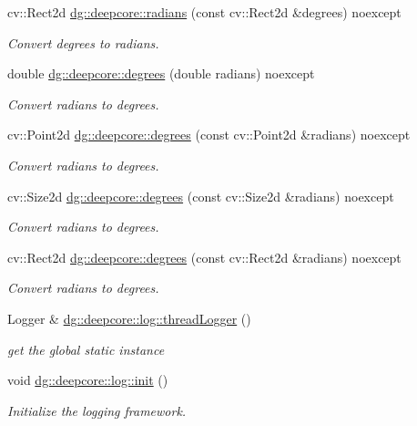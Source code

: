\begin{DoxyCompactItemize}
cv\+::\+Rect2d \hyperlink{group___utility_module_ga7712032c74d8bc4e9c392964d4e18e8c}{dg\+::deepcore\+::radians} (const cv\+::\+Rect2d \&degrees) noexcept
\begin{DoxyCompactList}\small\item\em Convert degrees to radians. \end{DoxyCompactList}\item 
double \hyperlink{group___utility_module_gac74d2fa0aeac8bd310ed61663a153e84}{dg\+::deepcore\+::degrees} (double radians) noexcept
\begin{DoxyCompactList}\small\item\em Convert radians to degrees. \end{DoxyCompactList}\item 
cv\+::\+Point2d \hyperlink{group___utility_module_ga8ee006518e8f0489aa3e18166d74c6fe}{dg\+::deepcore\+::degrees} (const cv\+::\+Point2d \&radians) noexcept
\begin{DoxyCompactList}\small\item\em Convert radians to degrees. \end{DoxyCompactList}\item 
cv\+::\+Size2d \hyperlink{group___utility_module_gaa1f8aec2237eca2394ae5df2528e8eca}{dg\+::deepcore\+::degrees} (const cv\+::\+Size2d \&radians) noexcept
\begin{DoxyCompactList}\small\item\em Convert radians to degrees. \end{DoxyCompactList}\item 
cv\+::\+Rect2d \hyperlink{group___utility_module_ga1be3f98796bf80ec2aa5899e73269be7}{dg\+::deepcore\+::degrees} (const cv\+::\+Rect2d \&radians) noexcept
\begin{DoxyCompactList}\small\item\em Convert radians to degrees. \end{DoxyCompactList}\item 
Logger \& \hyperlink{group___utility_module_ga94a3335f72a1830e58c8386c35015b2b}{dg\+::deepcore\+::log\+::thread\+Logger} ()
\begin{DoxyCompactList}\small\item\em get the global static instance \end{DoxyCompactList}\item 
void \hyperlink{group___utility_module_gaedfd950d41ec88d7eff2a7a9929e45e8}{dg\+::deepcore\+::log\+::init} ()
\begin{DoxyCompactList}\small\item\em Initialize the logging framework. \end{DoxyCompactList}\item 

\end{DoxyCompactItemize}

